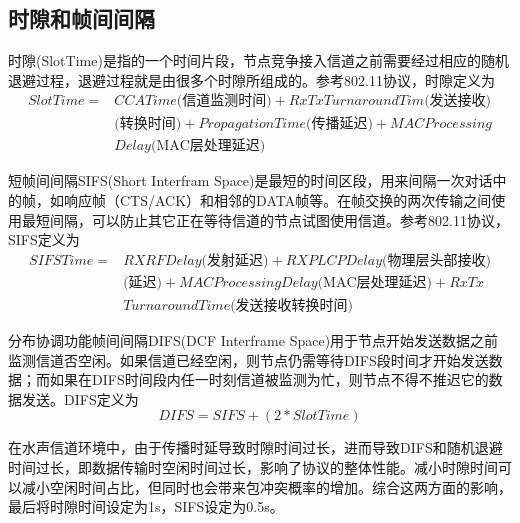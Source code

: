 \subsection{时隙和帧间间隔}
时隙(SlotTime)是指的一个时间片段，节点竞争接入信道之前需要经过相应的随机退避过程，退避过程就是由很多个时隙所组成的。参考802.11协议，时隙定义为
\begin{equation}
\begin{aligned}
SlotTime=&CCATime\mbox{(信道监测时间)}+RxTxTurnaroundTim\mbox{(发送接收)}\\&\mbox{(转换时间)}+PropagationTime\mbox{(传播延迟)}+MACProcessing\\&Delay\mbox{(MAC层处理延迟)}
\end{aligned}
\end{equation}

短帧间间隔SIFS(Short Interfram Space)是最短的时间区段，用来间隔一次对话中的帧，如响应帧（CTS/ACK）和相邻的DATA帧等。在帧交换的两次传输之间使用最短间隔，可以防止其它正在等待信道的节点试图使用信道。参考802.11协议，SIFS定义为
\begin{equation}
\begin{aligned}
SIFSTime=&RXRFDelay\mbox{(发射延迟)}+RXPLCPDelay\mbox{(物理层头部接收)}\\&\mbox{(延迟)}+MACProcessingDelay\mbox{(MAC层处理延迟)}+ RxTx\\&TurnaroundTime\mbox{(发送接收转换时间)}
\end{aligned}
\end{equation}

分布协调功能帧间间隔DIFS(DCF Interframe Space)用于节点开始发送数据之前监测信道否空闲。如果信道已经空闲，则节点仍需等待DIFS段时间才开始发送数据；而如果在DIFS时间段内任一时刻信道被监测为忙，则节点不得不推迟它的数据发送。DIFS定义为
\begin{equation}
DIFS=SIFS+(2*SlotTime)
\end{equation}

在水声信道环境中，由于传播时延导致时隙时间过长，进而导致DIFS和随机退避时间过长，即数据传输时空闲时间过长，影响了协议的整体性能。减小时隙时间可以减小空闲时间占比，但同时也会带来包冲突概率的增加。综合这两方面的影响，最后将时隙时间设定为1s，SIFS设定为0.5s。
